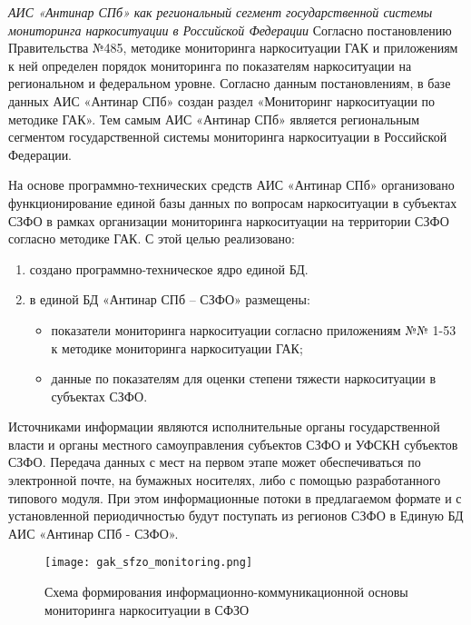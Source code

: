 \textit{АИС «Антинар СПб» как региональный сегмент государственной системы
мониторинга наркоситуации в Российской Федерации}
Согласно постановлению Правительства №485, методике мониторинга
наркоситуации ГАК и приложениям к ней определен порядок мониторинга по
показателям наркоситуации на региональном и федеральном уровне. Согласно данным
постановлениям, в базе данных АИС «Антинар СПб» создан раздел «Мониторинг
наркоситуации по методике ГАК». Тем самым АИС «Антинар СПб»
является региональным сегментом государственной системы мониторинга
наркоситуации в Российской Федерации.

На основе программно-технических средств АИС «Антинар СПб» организовано
функционирование единой базы данных по вопросам наркоситуации в субъектах СЗФО в
рамках организации мониторинга наркоситуации на территории СЗФО согласно
методике ГАК. С этой целью реализовано:
\begin{enumerate}
\item создано программно-техническое ядро единой БД.
\item в единой БД «Антинар СПб – СЗФО» размещены:
\begin{itemize}
\item показатели мониторинга наркоситуации согласно приложениям №№ 1-53 к методике
мониторинга наркоситуации ГАК; 
\item данные по показателям для оценки степени тяжести наркоситуации в субъектах
 СЗФО.
\end{itemize}
\end{enumerate}
 Источниками информации являются исполнительные органы государственной
 власти и органы местного самоуправления субъектов СЗФО и УФСКН субъектов СЗФО. 
 Передача данных с мест на первом этапе может обеспечиваться по электронной
 почте, на бумажных носителях, либо с помощью разработанного типового модуля.
 При этом информационные потоки в предлагаемом формате и с установленной
 периодичностью будут поступать из регионов СЗФО в Единую БД АИС «Антинар СПб -
 СЗФО».

\begin{figure}
    \texttt{[image: gak\_sfzo\_monitoring.png]}
    \caption{Схема формирования информационно-коммуникационной основы
    мониторинга наркоситуации в СФЗО}
    \label{fig:gak_sfzo_monitoring}
\end{figure}

